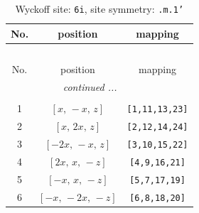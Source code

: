 \documentclass[fleqn,8pt]{jsarticle}
\begin{document}
\renewcommand{\arraystretch}{1.2}
\begin{longtable}{ccc}
\caption{Wyckoff site: {\tt 6i}, site symmetry: {\tt .m.1'}}
 \\
 \hline \hline
No. & position & mapping \\ \hline \endfirsthead

\multicolumn{2}{l}{\tablename\ \thetable{}} \\
 \hline \hline
No. & position & mapping \\ \hline \endhead

 \hline \hline
\multicolumn{2}{r}{\footnotesize\it continued ...} \\ \endfoot

 \hline \hline
\multicolumn{2}{r}{} \\ \endlastfoot

1 & $\left[ x,\, - x,\, z \right]$ & {\tt [1,11,13,23]} \\ \hline
2 & $\left[ x,\, 2 x,\, z \right]$ & {\tt [2,12,14,24]} \\ \hline
3 & $\left[ - 2 x,\, - x,\, z \right]$ & {\tt [3,10,15,22]} \\ \hline
4 & $\left[ 2 x,\, x,\, - z \right]$ & {\tt [4,9,16,21]} \\ \hline
5 & $\left[ - x,\, x,\, - z \right]$ & {\tt [5,7,17,19]} \\ \hline
6 & $\left[ - x,\, - 2 x,\, - z \right]$ & {\tt [6,8,18,20]} \\
\end{longtable}
\renewcommand{\arraystretch}{1.2}
\end{document}
